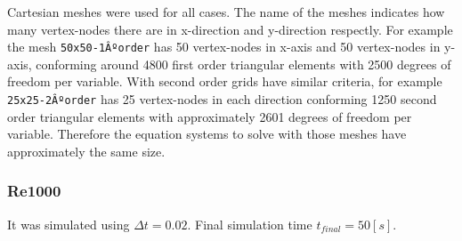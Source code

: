 
Cartesian meshes were used for all cases. The name of the meshes indicates how many vertex-nodes there are in x-direction and y-direction respectly. For example the mesh \texttt{50x50-1Âºorder} has 50 vertex-nodes in x-axis and 50 vertex-nodes in y-axis, conforming around 4800 first order triangular elements with 2500 degrees of freedom per variable. With second order grids have similar criteria, for example \texttt{25x25-2Âºorder} has 25 vertex-nodes in each direction conforming 1250 second order triangular elements with approximately 2601 degrees of freedom per variable. Therefore the equation systems to solve with those meshes have approximately the same size.

\subsubsection{Re1000}

It was simulated using $\Delta t = 0.02$. Final simulation time $t_{final} = 50[s]$.

